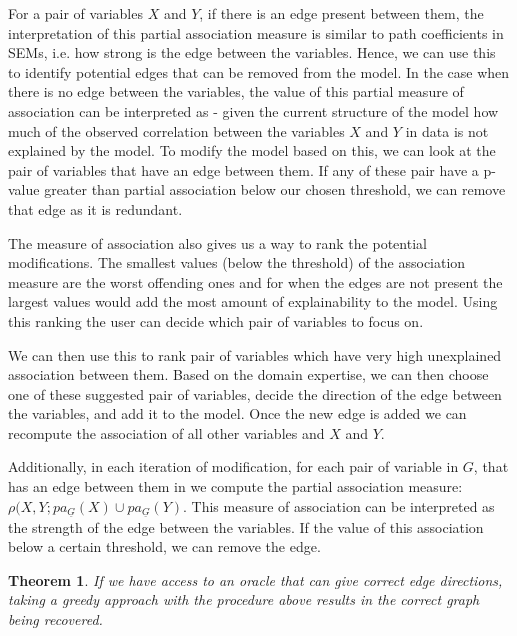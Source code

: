 \documentclass{uai2025} %
\newtheorem{theorem}{Theorem}
\begin{document}
For a pair of variables $ X $ and $ Y $, if there is an edge present between
them, the interpretation of this partial association measure is similar to path
coefficients in SEMs, i.e. how strong is the edge between the variables. Hence,
we can use this to identify potential edges that can be removed from the model.
In the case when there is no edge between the variables, the value of this
partial measure of association can be interpreted as - given the current
structure of the model how much of the observed correlation between the
variables $ X $ and $ Y $ in data is not explained by the model. To modify the
model based on this, we can look at the pair of variables that have an edge
between them. If any of these pair have a p-value greater than partial
association below our chosen threshold, we can remove that edge as it is
redundant.

The measure of association also gives us a way to rank the potential
modifications. The smallest values (below the threshold) of the association
measure are the worst offending ones and for when the edges are not present the
largest values would add the most amount of explainability to the model. Using
this ranking the user can decide which pair of variables to focus on.

We can then use this to rank pair of variables which have very high unexplained
association between them. Based on the domain expertise, we can then choose one
of these suggested pair of variables, decide the direction of the edge between
the variables, and add it to the model. Once the new edge is added we can
recompute the association of all other variables and $ X $ and $ Y $.

Additionally, in each iteration of modification, for each pair of variable in $
G $, that has an edge between them in we compute the partial association
measure: $ \rho(X, Y; pa_{\underline{G}}(X) \cup pa_{\underline{G}}(Y) $. This
measure of association can be interpreted as the strength of the edge between
the variables. If the value of this association below a certain threshold, we
can remove the edge.


\begin{theorem}
	If we have access to an oracle that can give correct edge directions, taking a
	greedy approach with the procedure above results in the correct graph
	being recovered. 
\end{theorem}
\end{document}
